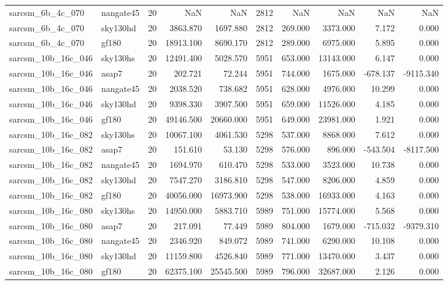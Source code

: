 \begin{longtable}{llrrrrrrrr}
sarcsm\_6b\_4c\_070 & nangate45 & 20 & NaN & NaN & 2812 & NaN & NaN & NaN & NaN \\
sarcsm\_6b\_4c\_070 & sky130hd & 20 & 3863.870 & 1697.880 & 2812 & 269.000 & 3373.000 & 7.172 & 0.000 \\
sarcsm\_6b\_4c\_070 & gf180 & 20 & 18913.100 & 8690.170 & 2812 & 289.000 & 6975.000 & 5.895 & 0.000 \\
sarcsm\_10b\_16c\_046 & sky130hs & 20 & 12491.400 & 5028.570 & 5951 & 653.000 & 13143.000 & 6.147 & 0.000 \\
sarcsm\_10b\_16c\_046 & asap7 & 20 & 202.721 & 72.244 & 5951 & 744.000 & 1675.000 & -678.137 & -9115.340 \\
sarcsm\_10b\_16c\_046 & nangate45 & 20 & 2038.520 & 738.682 & 5951 & 628.000 & 4976.000 & 10.299 & 0.000 \\
sarcsm\_10b\_16c\_046 & sky130hd & 20 & 9398.330 & 3907.500 & 5951 & 659.000 & 11526.000 & 4.185 & 0.000 \\
sarcsm\_10b\_16c\_046 & gf180 & 20 & 49146.500 & 20660.000 & 5951 & 649.000 & 23981.000 & 1.921 & 0.000 \\
sarcsm\_10b\_16c\_082 & sky130hs & 20 & 10067.100 & 4061.530 & 5298 & 537.000 & 8868.000 & 7.612 & 0.000 \\
sarcsm\_10b\_16c\_082 & asap7 & 20 & 151.610 & 53.130 & 5298 & 576.000 & 896.000 & -543.504 & -8117.500 \\
sarcsm\_10b\_16c\_082 & nangate45 & 20 & 1694.970 & 610.470 & 5298 & 533.000 & 3523.000 & 10.738 & 0.000 \\
sarcsm\_10b\_16c\_082 & sky130hd & 20 & 7547.270 & 3186.810 & 5298 & 547.000 & 8206.000 & 4.859 & 0.000 \\
sarcsm\_10b\_16c\_082 & gf180 & 20 & 40056.000 & 16973.900 & 5298 & 538.000 & 16933.000 & 4.163 & 0.000 \\
sarcsm\_10b\_16c\_080 & sky130hs & 20 & 14950.000 & 5883.710 & 5989 & 751.000 & 15774.000 & 5.568 & 0.000 \\
sarcsm\_10b\_16c\_080 & asap7 & 20 & 217.091 & 77.449 & 5989 & 804.000 & 1679.000 & -715.032 & -9379.310 \\
sarcsm\_10b\_16c\_080 & nangate45 & 20 & 2346.920 & 849.072 & 5989 & 741.000 & 6290.000 & 10.108 & 0.000 \\
sarcsm\_10b\_16c\_080 & sky130hd & 20 & 11159.800 & 4526.840 & 5989 & 771.000 & 13470.000 & 3.437 & 0.000 \\
sarcsm\_10b\_16c\_080 & gf180 & 20 & 62375.100 & 25545.500 & 5989 & 796.000 & 32687.000 & 2.126 & 0.000 \\

\end{longtable}
